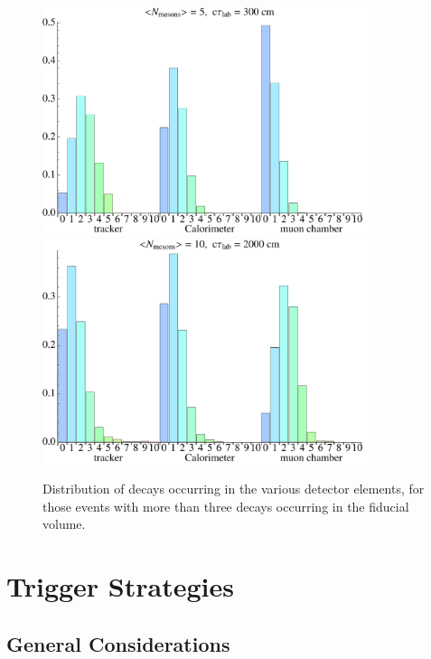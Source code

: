 \begin{figure}
\includegraphics[width=0.85\textwidth]{figures/emerging_histograms_5.pdf}\\
\vspace{1cm}
\includegraphics[width=0.85\textwidth]{figures/emerging_histograms_10.pdf}
\caption{Distribution of decays occurring in the various detector elements, for those events with more than three decays occurring in the fiducial volume.\label{fig:detectorelements}}
\end{figure}

\section{Trigger Strategies}
\label{sec:darkshowertrig}

\subsection{General Considerations}


